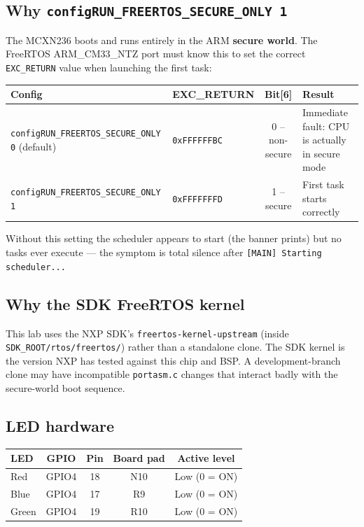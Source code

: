 \documentclass[11pt, a4paper]{article}
\newcommand{\file}[1]{\texttt{\small #1}}
\begin{document}
\subsection{Why \texttt{configRUN\_FREERTOS\_SECURE\_ONLY 1}}

The MCXN236 boots and runs entirely in the ARM \textbf{secure world}.
The FreeRTOS ARM\_CM33\_NTZ port must know this to set the correct
\texttt{EXC\_RETURN} value when launching the first task:

\renewcommand{\arraystretch}{1.3}
\begin{tabular}{@{} l l c p{5cm} @{}}
  \toprule
  \textbf{Config} & \textbf{EXC\_RETURN} & \textbf{Bit[6]} & \textbf{Result} \\
  \midrule
  \texttt{configRUN\_FREERTOS\_SECURE\_ONLY 0} (default)
    & \texttt{0xFFFFFFBC} & 0 -- non-secure
    & Immediate fault: CPU is actually in secure mode \\
  \texttt{configRUN\_FREERTOS\_SECURE\_ONLY 1}
    & \texttt{0xFFFFFFFD} & 1 -- secure
    & First task starts correctly \\
  \bottomrule
\end{tabular}
\renewcommand{\arraystretch}{1}

\medskip
Without this setting the scheduler appears to start (the banner prints) but
no tasks ever execute --- the symptom is total silence after
\texttt{[MAIN] Starting scheduler...}

\subsection{Why the SDK FreeRTOS kernel}

This lab uses the NXP SDK's \texttt{freertos-kernel-upstream}
(inside \texttt{SDK\_ROOT/rtos/freertos/}) rather than a standalone clone.
The SDK kernel is the version NXP has tested against this chip and BSP.
A development-branch clone may have incompatible \file{portasm.c} changes that
interact badly with the secure-world boot sequence.

\subsection{LED hardware}

\renewcommand{\arraystretch}{1.3}
\begin{tabular}{@{} l c c c c @{}}
  \toprule
  \textbf{LED} & \textbf{GPIO} & \textbf{Pin} & \textbf{Board pad} & \textbf{Active level} \\
  \midrule
  Red   & GPIO4 & 18 & N10 & Low (0 = ON) \\
  Blue  & GPIO4 & 17 & R9  & Low (0 = ON) \\
  Green & GPIO4 & 19 & R10 & Low (0 = ON) \\
  \bottomrule
\end{tabular}
\renewcommand{\arraystretch}{1}
\end{document}
